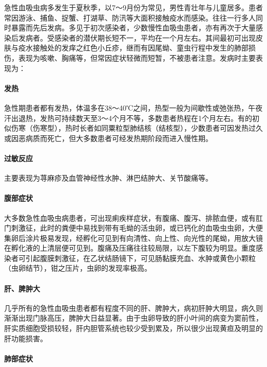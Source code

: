 急性血吸虫病多发生于夏秋季，以7～9月份为常见，男性青壮年与儿童居多。患者常因游泳、捕鱼、捉蟹、打湖草、防汛等大面积接触疫水而感染。往往一行多人同时暴露而先后发病。多见于初次感染者，少数慢性血吸虫患者，亦有再次于大量感染后发病者。受感染者的潜伏期长短不一，平均在一个月左右。其间最初可出现皮肤与疫水接触处的发痒之红色小丘疹，继而有因尾蚴、童虫行程中发生的肺部损伤，表现为咳嗽、胸痛等，但常因症状轻微而短暂，不被患者注意。发病时主要表现为：

\paragraph{发热}

急性期患者都有发热，体温多在38～40℃之间，热型一般为间歇性或弛张热，午夜汗出退热，发热可持续数天至3～4个月不等，多数患者热程在1个月左右。有的初似伤寒（伤寒型），热时长者如同粟粒型肺结核（结核型），少数患者可因发热过久或因恶病质而死亡，但大多数患者可经发热期阶段而进入慢性期。

\paragraph{过敏反应}

主要表现为荨麻疹及血管神经性水肿、淋巴结肿大、关节酸痛等。

\paragraph{腹部症状}

大多数急性血吸虫病患者，可出现痢疾样症状，有腹痛、腹泻、排脓血便，或有肛门刺激征，此时的粪便中易找到带有毛蚴的活虫卵，或已钙化的血吸虫虫卵，大便集卵后涂片极易发现，经孵化可见到有向清性、向上性、向光性的尾蚴，用放大镜在孵化液的上清层便可见到。腹痛及压痛往往较局限，以左下腹较为明显。重度感染者可引起腹膜刺激征，在乙状结肠镜下，可见肠黏膜充血、水肿或黄色小颗粒（虫卵结节），钳之压片，虫卵的发现率极高。

\paragraph{肝、脾肿大}

几乎所有的急性血吸虫患者都有程度不同的肝、脾肿大，病初肝肿大明显，病久则渐渐出现门脉高压，脾肿大日益显著。由于虫卵导致的肝小叶间的病变为窦前性，肝实质细胞受损较轻，肝内胆管系统也较少受到累及，所以很少出现黄疸及明显的肝功能损害。

\paragraph{肺部症状}

